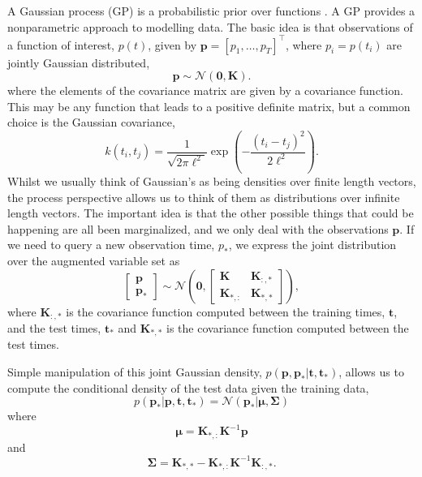\documentclass{article}
\begin{document}
A  Gaussian  process (GP)  is  a  probabilistic  prior over  functions
\cite{Rasmussen:book06}.  A GP  provides a  nonparametric  approach to
modelling data. The  basic idea is that observations  of a function of
interest,   $p(t)$,   given  by   $\mathbf{p}   =  \left[p_1,   \dots,
  p_T\right]^\top$,   where    $p_i=p(t_i)$   are   jointly   Gaussian
distributed,
\begin{equation}
  \mathbf{p} \sim \mathcal{N}(\mathbf{0}, \mathbf{K}).
\end{equation}
where the elements of the  covariance matrix are given by a covariance
function. This may  be any function that leads  to a positive definite
matrix, but a common choice is the Gaussian covariance,
\begin{equation}
  k(t_i,   t_j)   =  \frac{1}{\sqrt{2\pi   \ell^2}}\exp\left(-\frac{(t_i
      -t_j)^2}{2\ell^2}\right).
\end{equation}
Whilst we usually  think of Gaussian's as being  densities over finite
length vectors, the process perspective  allows us to think of them as
distributions over infinite length vectors. The important idea is that
the  other  possible things  that  could  be  happening are  all  been
marginalized, and we only  deal with the observations $\mathbf{p}$. If
we need to  query a new observation time, $p_*$,  we express the joint
distribution over the augmented variable set as
\begin{equation}
  \left[\begin{matrix}
      \mathbf{p}\\
      \mathbf{p}_*
    \end{matrix}\right]
  \sim \mathcal{N}\left(\mathbf{0}, \left[\begin{matrix}
        \mathbf{K} & \mathbf{K}_{:,*}\\
        \mathbf{K}_{*,:} & \mathbf{K}_{*,*}
      \end{matrix}
    \right]\right),
\end{equation}
where $\mathbf{K}_{:,*}$  is the covariance  function computed between
the training  times, $\mathbf{t}$, and the  test times, $\mathbf{t}_*$
and $\mathbf{K}_{*,*}$ is the covariance function computed between the
test times.

Simple  manipulation of  this joint  Gaussian  density, $p(\mathbf{p},
\mathbf{p_*}|\mathbf{t},  \mathbf{t}_*)$,  allows  us to  compute  the
conditional density of the test data given the training data,
\begin{equation}
  p(\mathbf{p}_* | \mathbf{p}, \mathbf{t}, \mathbf{t}_*) = \mathcal{N}\left(\mathbf{p}_*|\boldsymbol{\mu}, \boldsymbol{\Sigma}\right)
\end{equation}
where
\begin{equation}
  \boldsymbol{\mu} = \mathbf{K}_{*,:}\mathbf{K}^{-1}\mathbf{p}
\end{equation}
and 
\begin{equation}
  \boldsymbol{\Sigma} = \mathbf{K}_{*,*} - \mathbf{K}_{*,:}\mathbf{K}^{-1}\mathbf{K}_{:,*}.
\end{equation}
\end{document}
